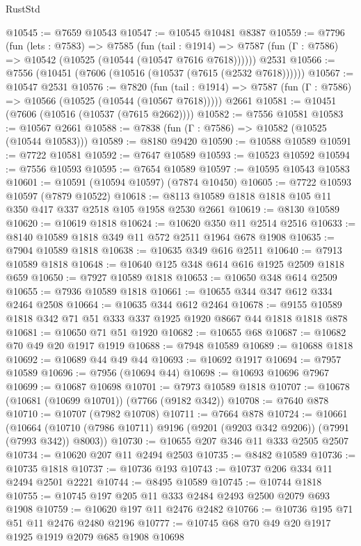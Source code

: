 \begin{lexlean}{RustStd}
\begin{coremodule}
{\begin{coremodule}
{{{{{{{{{{{{{{{{{{{{{{{{{{{{{{{{{{{{{{{{{{{@10545 := @7659 @10543
@10547 := @10545 @10481 @8387
@10559 := @7796
    (fun (lets : @7583) =>
    @7585
      (fun (tail : @1914) =>
      @7587 (fun (Γ : @7586) => @10542 (@10525 (@10544 (@10547 @7616 @7618))))))
    @2531
@10566 := @7556 (@10451 (@7606 (@10516 (@10537 (@7615 (@2532 @7618))))))
@10567 := @10547 @2531
@10576 := @7820
    (fun (tail : @1914) => @7587 (fun (Γ : @7586) => @10566 (@10525 (@10544 (@10567 @7618)))))
    @2661
@10581 := @10451 (@7606 (@10516 (@10537 (@7615 @2662))))
@10582 := @7556 @10581
@10583 := @10567 @2661
@10588 := @7838 (fun (Γ : @7586) => @10582 (@10525 (@10544 @10583)))
@10589 := @8180 @9420
@10590 := @10588 @10589
@10591 := @7722 @10581
@10592 := @7647 @10589
@10593 := @10523 @10592
@10594 := @7556 @10593
@10595 := @7654 @10589
@10597 := @10595 @10543 @10583
@10601 := @10591 (@10594 @10597) (@7874 @10450)
@10605 := @7722 @10593 @10597 (@7879 @10522)
@10618 := @8113 @10589 @1818 @1818 @105 @11 @350 @417 @337 @2518 @105 @1958 @2530 @2661
@10619 := @8130 @10589
@10620 := @10619 @1818
@10624 := @10620 @350 @11 @2514 @2516
@10633 := @8140 @10589 @1818 @349 @11 @572 @2511 @1964 @678 @1908
@10635 := @7904 @10589 @1818
@10638 := @10635 @349 @616 @2511
@10640 := @7913 @10589 @1818
@10648 := @10640 @125 @348 @614 @616 @1925 @2509 @1818 @659
@10650 := @7927 @10589 @1818
@10653 := @10650 @348 @614 @2509
@10655 := @7936 @10589 @1818
@10661 := @10655 @344 @347 @612 @334 @2464 @2508
@10664 := @10635 @344 @612 @2464
@10678 := @9155 @10589 @1818 @342 @71 @51 @333 @337 @1925 @1920 @8667 @44 @1818 @1818 @878
@10681 := @10650 @71 @51 @1920
@10682 := @10655 @68
@10687 := @10682 @70 @49 @20 @1917 @1919
@10688 := @7948 @10589
@10689 := @10688 @1818
@10692 := @10689 @44 @49 @44
@10693 := @10692 @1917
@10694 := @7957 @10589
@10696 := @7956 (@10694 @44)
@10698 := @10693 @10696 @7967
@10699 := @10687 @10698
@10701 := @7973 @10589 @1818
@10707 := @10678 (@10681 (@10699 @10701)) (@7766 (@9182 @342))
@10708 := @7640 @878
@10710 := @10707 (@7982 @10708)
@10711 := @7664 @878
@10724 := @10661
    (@10664 (@10710 (@7986 @10711) @9196 (@9201 (@9203 @342 @9206)) (@7991 (@7993 @342)) @8003))
@10730 := @10655 @207 @346 @11 @333 @2505 @2507
@10734 := @10620 @207 @11 @2494 @2503
@10735 := @8482 @10589
@10736 := @10735 @1818
@10737 := @10736 @193
@10743 := @10737 @206 @334 @11 @2494 @2501 @2221
@10744 := @8495 @10589
@10745 := @10744 @1818
@10755 := @10745 @197 @205 @11 @333 @2484 @2493 @2500 @2079 @693 @1908
@10759 := @10620 @197 @11 @2476 @2482
@10766 := @10736 @195 @71 @51 @11 @2476 @2480 @2196
@10777 := @10745 @68 @70 @49 @20 @1917 @1925 @1919 @2079 @685 @1908 @10698
}}}}}}}}}}}}}}}}}}}}}}}}}}}}}}}}}}}}}}}}}}}
\end{coremodule}}
\end{coremodule}
\end{lexlean}
